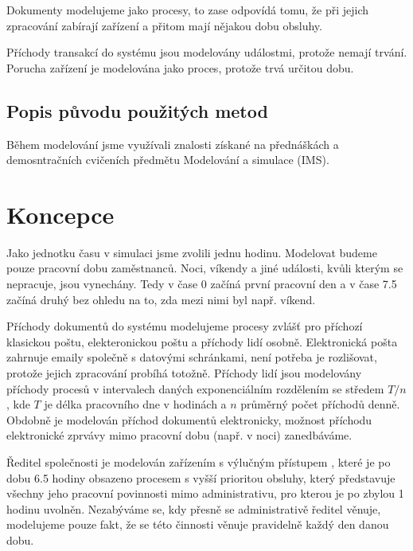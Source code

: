 \documentclass[12pt,a4paper]{article}
\begin{document}
Dokumenty modelujeme jako procesy, to zase odpovídá tomu, že při jejich zpracování zabírají zařízení a přitom mají nějakou dobu obsluhy.

Příchody transakcí do systému jsou modelovány událostmi, protože nemají trvání. Po\-ru\-cha zařízení je modelována jako proces, protože trvá určitou dobu.

\subsection{Popis původu použitých metod}

Během modelování jsme využívali znalosti získané na přednáškách a demosntračních cvičeních předmětu Modelování a simulace (IMS).


\newpage

\section{Koncepce}

Jako jednotku času v simulaci jsme zvolili jednu hodinu.
Modelovat \cite{ims-zakladni-pojmy} budeme pouze pracovní dobu zaměstnanců. Noci, víkendy a jiné události, kvůli kterým se nepracuje, jsou vynechány.
Tedy v čase 0 začíná první pracovní den a v čase 7.5 začíná druhý bez ohledu na to, zda mezi nimi byl např. víkend.

Příchody dokumentů do systému modelujeme procesy zvlášť pro příchozí klasickou poštu, elekteronickou poštu a příchody lidí osobně.
Elektronická pošta zahrnuje emaily společně s datovými schránkami, není potřeba je rozlišovat, protože jejich zpracování probíhá totožně.
Příchody lidí jsou modelovány příchody procesů v intervalech daných exponenciálním rozdělením se středem $T/n$ \cite{ims-rozlozeni}, kde $T$ je délka pracovního dne v ho\-di\-nách a $n$ průměrný počet příchodů denně.
Obdobně je modelován příchod dokumentů elektronicky, možnost příchodu elektronické zprvávy mimo pracovní dobu (např. v noci) zanedbáváme.

Ředitel společnosti je modelován zařízením s výlučným přístupem \cite{ims-zarizeni}, které je po dobu 6.5 hodiny obsazeno procesem s vyšší prioritou obsluhy,
který představuje všechny jeho pracovní povinnosti mimo administrativu, pro kterou je po zbylou 1 hodinu uvolněn.
Ne\-za\-bý\-vá\-me se, kdy přesně se administrativě ředitel věnuje, modelujeme pouze fakt, že se této činnosti věnuje pravidelně každý den danou dobu.
\end{document}
